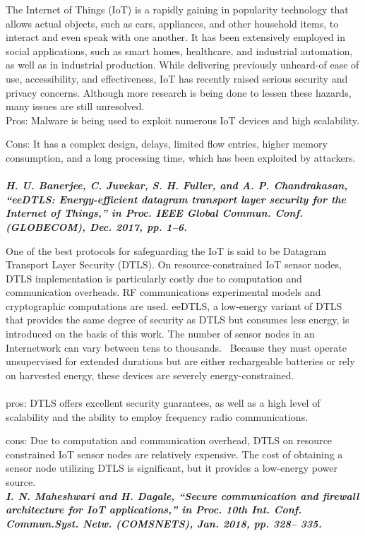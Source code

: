 \documentclass[12pt,a4paper,twocolumn,fleqn]{article}
\begin{document}
The Internet of Things (IoT) is a rapidly gaining in popularity technology that allows actual objects, such as cars, appliances, and other household items, to interact and even speak with one another. It has been extensively employed in social applications, such as smart homes, healthcare, and industrial automation, as well as in industrial production. While delivering previously unheard-of ease of use, accessibility, and effectiveness, IoT has recently raised serious security and privacy concerns. Although more research is being done to lessen these hazards, many issues are still unresolved.\\
Pros: Malware is being used to exploit numerous IoT devices and high scalability.
 
Cons: It has a complex design, delays, limited flow entries, higher memory consumption, and a long processing time, which has been exploited by attackers.
\\ \\
\textbf{\emph {H. U. Banerjee, C. Juvekar, S. H. Fuller, and A. P. Chandrakasan, “eeDTLS: Energy-efficient datagram transport layer security for the Internet of Things,” in Proc. IEEE Global Commun. Conf. (GLOBECOM), Dec. 2017, pp. 1–6.}}

One of the best protocols for safeguarding the IoT is said to be Datagram Transport Layer Security (DTLS). On resource-constrained IoT sensor nodes, DTLS implementation is particularly costly due to computation and communication overheads. RF communications experimental models and cryptographic computations are used. eeDTLS, a low-energy variant of DTLS that provides the same degree of security as DTLS but consumes less energy, is introduced on the basis of this work. The number of sensor nodes in an Internetwork can vary between tens to thousands.  Because they must operate unsupervised for extended durations but are either rechargeable batteries or rely on harvested energy, these devices are severely energy-constrained.\\
 \\
pros: DTLS offers excellent security guarantees, as well as a high level of scalability and the ability to employ frequency radio communications.
 
cons: Due to computation and communication overhead, DTLS on resource constrained IoT sensor nodes are relatively expensive. The cost of obtaining a sensor node utilizing DTLS is significant, but it provides a low-energy power source.
\\ 
\textbf{\emph {I. N. Maheshwari and H. Dagale, “Secure communication and firewall architecture for IoT applications,” in Proc. 10th Int. Conf. Commun.Syst. Netw. (COMSNETS), Jan. 2018, pp. 328– 335.}}
\end{document}
